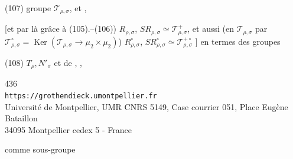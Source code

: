 \noindent(107) groupe $\mathcal{T}_{\rho,\sigma}$, et 
,

[et par là grâce à (105).--(106)) $R_{\rho,\sigma}$,
$SR_{\rho,\sigma}\simeq\mathcal{T}_{\rho,\sigma}^{+}$, et aussi
(en 
$\mathcal{T}_{\rho,\sigma}$ par
$\mathcal{T}_{\rho,\sigma}^{\circ}=\operatorname{Ker}
(\mathcal{T}_{\rho,\sigma}\longrightarrow\mu_2\times\mu_2)$)
$R_{\rho,\sigma}^{\circ}$,
$SR_{\rho,\sigma}^{\circ}\simeq\mathcal{T}_{\rho,\sigma}^{+\circ}$
\unsure{$\Rightarrow$}]
en termes des groupes

\begin{samepage}
\noindent(108) $T_\rho,N'_\sigma$ et de
,
,
\end{samepage}


\begin{center}
{\small
436\\
\texttt{https://grothendieck.umontpellier.fr}\\
Université de Montpellier, UMR CNRS 5149, Case courrier 051, Place Eugène Bataillon\\
34095 Montpellier cedex 5 - France
}
\end{center}


comme sous-groupe


